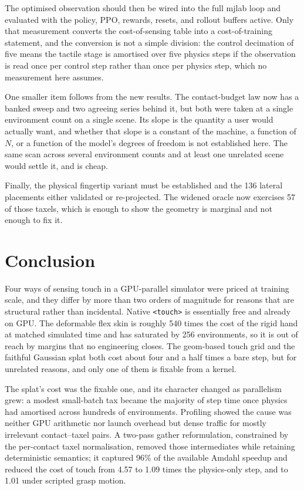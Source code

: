 \documentclass[journal]{IEEEtran}
\begin{document}
The optimised observation should then be wired into the full mjlab loop and evaluated with the policy, PPO, rewards, resets, and rollout buffers active. Only that measurement converts the cost-of-sensing table into a cost-of-training statement, and the conversion is not a simple division: the control decimation of five means the tactile stage is amortised over five physics steps if the observation is read once per control step rather than once per physics step, which no measurement here assumes.

One smaller item follows from the new results. The contact-budget law now has a banked sweep and two agreeing series behind it, but both were taken at a single environment count on a single scene. Its slope is the quantity a user would actually want, and whether that slope is a constant of the machine, a function of $N$, or a function of the model's degrees of freedom is not established here. The same scan across several environment counts and at least one unrelated scene would settle it, and is cheap.

Finally, the physical fingertip variant must be established and the 136 lateral placements either validated or re-projected. The widened oracle now exercises 57 of those taxels, which is enough to show the geometry is marginal and not enough to fix it.

\section{Conclusion}

Four ways of sensing touch in a GPU-parallel simulator were priced at training scale, and they differ by more than two orders of magnitude for reasons that are structural rather than incidental. Native \texttt{\textless touch\textgreater} is essentially free and already on GPU. The deformable flex skin is roughly 540 times the cost of the rigid hand at matched simulated time and has saturated by 256 environments, so it is out of reach by margins that no engineering closes. The geom-based touch grid and the faithful Gaussian splat both cost about four and a half times a bare step, but for unrelated reasons, and only one of them is fixable from a kernel.

The splat's cost was the fixable one, and its character changed as parallelism grew: a modest small-batch tax became the majority of step time once physics had amortised across hundreds of environments. Profiling showed the cause was neither GPU arithmetic nor launch overhead but dense traffic for mostly irrelevant contact--taxel pairs. A two-pass gather reformulation, constrained by the per-contact taxel normalisation, removed those intermediates while retaining deterministic semantics; it captured 96\% of the available Amdahl speedup and reduced the cost of touch from 4.57 to 1.09 times the physics-only step, and to 1.01 under scripted grasp motion.
\end{document}
